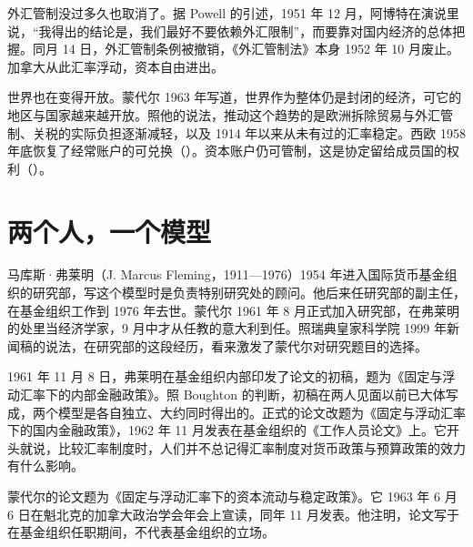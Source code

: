 外汇管制没过多久也取消了。据 Powell 的引述，1951 年 12 月，阿博特在演说里说，“我得出的结论是，我们最好不要依赖外汇限制”，而要靠对国内经济的总体把握\cite{powell2005}。同月 14 日，外汇管制条例被撤销，《外汇管制法》本身 1952 年 10 月废止\cite{powell2005}。加拿大从此汇率浮动，资本自由进出。

世界也在变得开放。蒙代尔 1963 年写道，世界作为整体仍是封闭的经济，可它的地区与国家越来越开放\cite{mundell1963}。照他的说法，推动这个趋势的是欧洲拆除贸易与外汇管制、关税的实际负担逐渐减轻，以及 1914 年以来从未有过的汇率稳定\cite{mundell1963}。西欧 1958 年底恢复了经常账户的可兑换（）。资本账户仍可管制，这是协定留给成员国的权利（）。

\section{两个人，一个模型}\label{sec:mundell-origins}

马库斯·弗莱明（J. Marcus Fleming，1911—1976）1954 年进入国际货币基金组织的研究部，写这个模型时是负责特别研究处的顾问\cite{boughton2003,loc37,gnd37}。他后来任研究部的副主任，在基金组织工作到 1976 年去世\cite{boughton2003}。蒙代尔 1961 年 8 月正式加入研究部，在弗莱明的处里当经济学家，9 月中才从任教的意大利到任\cite{boughton2003}。照瑞典皇家科学院 1999 年新闻稿的说法，在研究部的这段经历，看来激发了蒙代尔对研究题目的选择\cite{nobel1999}。

1961 年 11 月 8 日，弗莱明在基金组织内部印发了论文的初稿，题为《固定与浮动汇率下的内部金融政策》\cite{boughton2003}。照 Boughton 的判断，初稿在两人见面以前已大体写成，两个模型是各自独立、大约同时得出的\cite{boughton2003}。正式的论文改题为《固定与浮动汇率下的国内金融政策》，1962 年 11 月发表在基金组织的《工作人员论文》上\cite{fleming1962,boughton2003}。它开头就说，比较汇率制度时，人们并不总记得汇率制度对货币政策与预算政策的效力有什么影响\cite{fleming1962}。

蒙代尔的论文题为《固定与浮动汇率下的资本流动与稳定政策》\cite{mundell1963}。它 1963 年 6 月 6 日在魁北克的加拿大政治学会年会上宣读，同年 11 月发表\cite{mundell1963}。他注明，论文写于在基金组织任职期间，不代表基金组织的立场\cite{mundell1963}。

